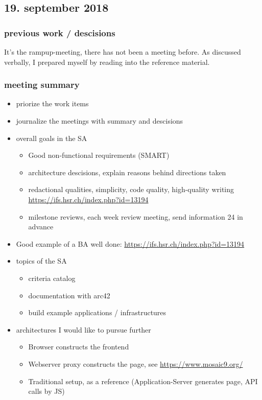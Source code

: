 
\subsection{19. september 2018}

\subsubsection{previous work / descisions}
It's the rampup-meeting, there has not been a meeting before. As discussed verbally, I prepared myself by reading into the reference material.

\subsubsection{meeting summary}

\begin{itemize}
    \item priorize the work items
    \item journalize the meetings with summary and descisions
    \item overall goals in the SA
        \begin{itemize}
            \item Good non-functional requirements (SMART)
            \item architecture descisions, explain reasons behind directions taken
            \item redactional qualities, simplicity, code quality, high-quality writing \url{https://ifs.hsr.ch/index.php?id=13194}
            \item milestone reviews, each week review meeting, send information 24 in advance 
        \end{itemize}
    \item Good example of a BA well done: \url{https://ifs.hsr.ch/index.php?id=13194}
    \item topics of the SA
        \begin{itemize}
            \item criteria catalog
            \item documentation with arc42
            \item build example applications / infrastructures 
        \end{itemize}
    \item architectures I would like to pursue further
        \begin{itemize}
            \item Browser constructs the frontend
            \item Webserver proxy constructs the page, see \url{https://www.mosaic9.org/}
            \item Traditional setup, as a reference (Application-Server generates page, API calls by JS)
        \end{itemize}
\end{itemize}

